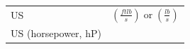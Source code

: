 \documentclass[
  letterpaper,
  DIV=11,
  numbers=noendperiod]{scrreprt}
\theoremstyle{definition}
\theoremstyle{remark}
\begin{document}
\begin{longtable}[]{@{}
  >{\raggedright\arraybackslash}p{}
  >{\raggedright\arraybackslash}p{}@{}}
US &
\(                                                                                                                                                                                                                                                                                                                                                                                                                                                                                                                                                                                                                                                                                                                                                                                                                              
                                                                                                                                                                                                                                                                                                                                                                                                                                                                                                                                                                                                                                                                                                                  \left(\frac{f t l b}{s}\right) \operatorname{or}\left(\frac{l b}{s}\right)                                                            
                                                                                                                                                                                                                                                                                                                                                                                                                                                                                                                                                                                                                                                                                                                  \) \\
US (horsepower, hP) &
\(                                                                                                                                                                                                                                                                                                                                                                                                                                                                                                                                                                                                                                                                                                                                                                                                                              

\end{longtable}
\end{document}
